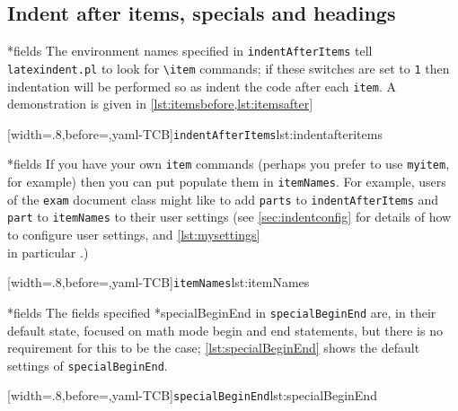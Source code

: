 \subsection{Indent after items, specials and headings}
*{fields}
	The environment names specified in \texttt{indentAfterItems} tell \texttt{latexindent.pl}
	to look for \lstinline!\item! commands; if these switches are set to \texttt{1} then
	indentation will be performed so as indent the code after each \texttt{item}. A
	demonstration is given in \cref{lst:itemsbefore,lst:itemsafter}

	\begin{cmhtcbraster}[raster columns=3,
			raster left skip=-3.5cm,
			raster right skip=-2cm,
			raster column skip=.03\linewidth]
		[width=.8\linewidth,before=\centering,yaml-TCB]{\texttt{indentAfterItems}}{lst:indentafteritems}
	\end{cmhtcbraster}

*{fields}
	If you have your own \texttt{item} commands (perhaps you prefer to use \texttt{myitem},
	for example) then you can put populate them in \texttt{itemNames}. For example, users of
	the \texttt{exam} document class might like to add \texttt{parts} to
	\texttt{indentAfterItems} and \texttt{part} to \texttt{itemNames} to their user settings
	(see \vref{sec:indentconfig} for details of how to configure user settings, and
	\vref{lst:mysettings} \\ in particular \label{page:examsettings}.)

	[width=.8\linewidth,before=\centering,yaml-TCB]{\texttt{itemNames}}{lst:itemNames}

*{fields}\label{yaml:specialBeginEnd}
	The fields specified
	*{specialBeginEnd} in \texttt{specialBeginEnd} are, in their default
	state, focused on math mode begin and end statements, but there is no requirement for
	this to be the case; \cref{lst:specialBeginEnd} shows the default settings of
	\texttt{specialBeginEnd}.

	[width=.8\linewidth,before=\centering,yaml-TCB]{\texttt{specialBeginEnd}}{lst:specialBeginEnd}

